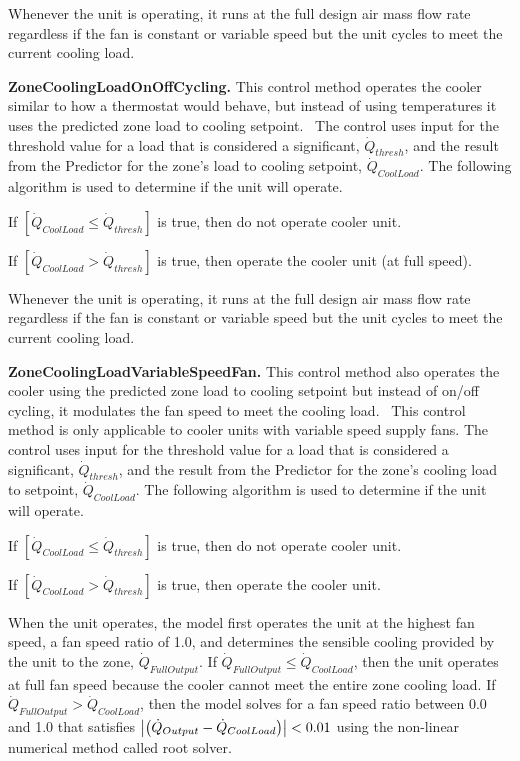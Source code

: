 Whenever the unit is operating, it runs at the full design air mass flow rate regardless if the fan is constant or variable speed but the unit cycles to meet the current cooling load.

\textbf{ZoneCoolingLoadOnOffCycling.} This control method operates the cooler similar to how a thermostat would behave, but instead of using temperatures it uses the predicted zone load to cooling setpoint.~ The control uses input for the threshold value for a load that is considered a significant, \({\dot Q_{thresh}}\), and the result from the Predictor for the zone's load to cooling setpoint, \({\dot Q_{CoolLoad}}\). The following algorithm is used to determine if the unit will operate.

If \(\left[ {{{\dot Q}_{CoolLoad}} \le {{\dot Q}_{thresh}}} \right]\) is true, then do not operate cooler unit.

If \(\left[ {{{\dot Q}_{CoolLoad}} > {{\dot Q}_{thresh}}} \right]\) is true, then operate the cooler unit (at full speed).

Whenever the unit is operating, it runs at the full design air mass flow rate regardless if the fan is constant or variable speed but the unit cycles to meet the current cooling load.

\textbf{ZoneCoolingLoadVariableSpeedFan.} This control method also operates the cooler using the predicted zone load to cooling setpoint but instead of on/off cycling, it modulates the fan speed to meet the cooling load.~ This control method is only applicable to cooler units with variable speed supply fans. The control uses input for the threshold value for a load that is considered a significant, \({\dot Q_{thresh}}\), and the result from the Predictor for the zone's cooling load to setpoint, \({\dot Q_{CoolLoad}}\). The following algorithm is used to determine if the unit will operate.

If \(\left[ {{{\dot Q}_{CoolLoad}} \le {{\dot Q}_{thresh}}} \right]\) is true, then do not operate cooler unit.

If \(\left[ {{{\dot Q}_{CoolLoad}} > {{\dot Q}_{thresh}}} \right]\) is true, then operate the cooler unit.

When the unit operates, the model first operates the unit at the highest fan speed, a fan speed ratio of 1.0, and determines the sensible cooling provided by the unit to the zone, $\dot{Q}_{FullOutput}$. If $\dot{Q}_{FullOutput} \leq \dot Q_{CoolLoad}$, then the unit operates at full fan speed because the cooler cannot meet the entire zone cooling load. If $\dot{Q}_{FullOutput} > \dot{Q}_{CoolLoad}$, then the model solves for a fan speed ratio between 0.0 and 1.0 that satisfies $\left|\PB{\dot{Q}_{Output}-\dot{Q}_{CoolLoad}}\right| < 0.01$ using the non-linear numerical method called root solver.

